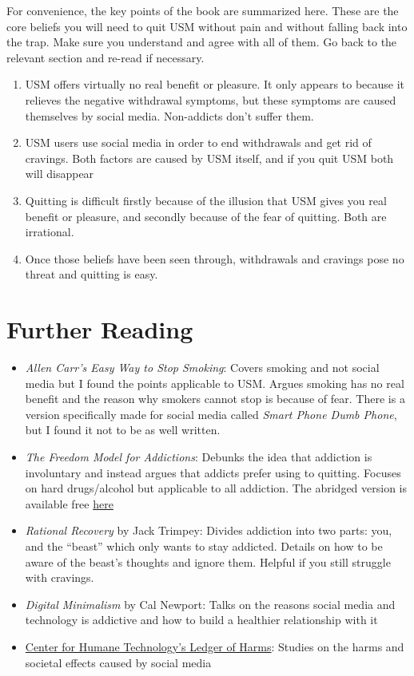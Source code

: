 \documentclass[
  openany]{book}
\providecommand{\tightlist}{%
  \setlength{\itemsep}{0pt}\setlength{\parskip}{0pt}}
\begin{document}
For convenience, the key points of the book are summarized here. These are the core beliefs you will need to quit USM without pain and without falling back into the trap. Make sure you understand and agree with all of them. Go back to the relevant section and re-read if necessary.

\begin{enumerate}
\def\labelenumi{\arabic{enumi}.}
\tightlist
\item
  USM offers virtually no real benefit or pleasure. It only appears to because it relieves the negative withdrawal symptoms, but these symptoms are caused themselves by social media. Non-addicts don't suffer them.
\item
  USM users use social media in order to end withdrawals and get rid of cravings. Both factors are caused by USM itself, and if you quit USM both will disappear
\item
  Quitting is difficult firstly because of the illusion that USM gives you real benefit or pleasure, and secondly because of the fear of quitting. Both are irrational.
\item
  Once those beliefs have been seen through, withdrawals and cravings pose no threat and quitting is easy.
\end{enumerate}

\appendix


\chapter{Further Reading}\label{further-reading}

\begin{itemize}
\tightlist
\item
  \emph{Allen Carr's Easy Way to Stop Smoking}: Covers smoking and not social media but I found the points applicable to USM. Argues smoking has no real benefit and the reason why smokers cannot stop is because of fear. There is a version specifically made for social media called \emph{Smart Phone Dumb Phone}, but I found it not to be as well written.
\item
  \emph{The Freedom Model for Addictions}: Debunks the idea that addiction is involuntary and instead argues that addicts prefer using to quitting. Focuses on hard drugs/alcohol but applicable to all addiction. The abridged version is available free \href{https://archive.org/details/freedom-model-abridged/Freedom\%20Model\%20Abridged/}{here}
\item
  \emph{Rational Recovery} by Jack Trimpey: Divides addiction into two parts: you, and the ``beast'' which only wants to stay addicted. Details on how to be aware of the beast's thoughts and ignore them. Helpful if you still struggle with cravings.
\item
  \emph{Digital Minimalism} by Cal Newport: Talks on the reasons social media and technology is addictive and how to build a healthier relationship with it
\item
  \href{https://ledger.humanetech.com/}{Center for Humane Technology's Ledger of Harms}: Studies on the harms and societal effects caused by social media
\end{itemize}
\end{document}
